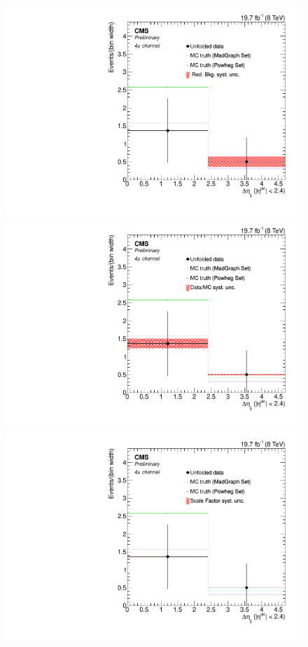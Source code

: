 \begin{figure}[hbtp]
\begin{center}
   \includegraphics[width=0.8\cmsFigWidth]{Figures/Unfolding/Systematics/ZZTo4m_CentralDeta_RedBkg_Mad_fr}     
   \includegraphics[width=0.8\cmsFigWidth]{Figures/Unfolding/Systematics/ZZTo4m_CentralDeta_UnfDataOverGenMC_Mad_fr}     
   \includegraphics[width=0.8\cmsFigWidth]{Figures/Unfolding/Systematics/ZZTo4m_CentralDeta_SFSq_Mad_fr}

\end{center}
\end{figure}
